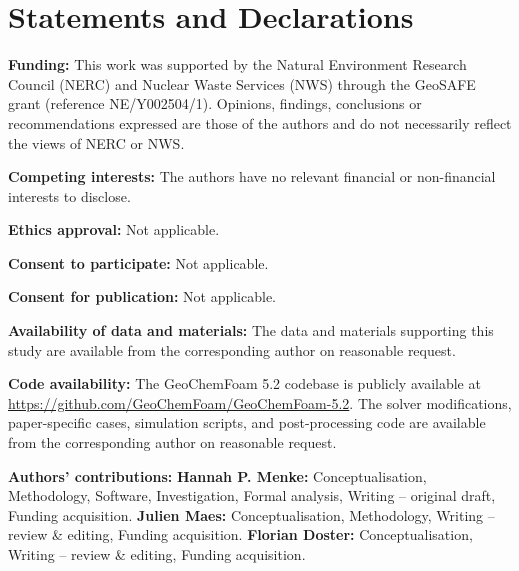 \documentclass[pdflatex,sn-basic]{sn-jnl}
\begin{document}
\backmatter



\section*{Statements and Declarations}

\textbf{Funding:} This work was supported by the Natural Environment Research
Council (NERC) and Nuclear Waste Services (NWS) through the GeoSAFE grant
(reference NE/Y002504/1). Opinions, findings, conclusions or recommendations
expressed are those of the authors and do not necessarily reflect the views
of NERC or NWS.

\textbf{Competing interests:} The authors have no relevant financial or
non-financial interests to disclose.

\textbf{Ethics approval:} Not applicable.

\textbf{Consent to participate:} Not applicable.

\textbf{Consent for publication:} Not applicable.

\textbf{Availability of data and materials:} The data and materials supporting
this study are available from the corresponding author on reasonable request.

\textbf{Code availability:} The GeoChemFoam 5.2 codebase is publicly available
at \url{https://github.com/GeoChemFoam/GeoChemFoam-5.2}. The solver modifications,
paper-specific cases, simulation scripts, and post-processing code are available
from the corresponding author on reasonable request.

\textbf{Authors' contributions:} \textbf{Hannah P. Menke:} Conceptualisation,
Methodology, Software, Investigation, Formal analysis, Writing -- original
draft, Funding acquisition. \textbf{Julien Maes:} Conceptualisation,
Methodology, Writing -- review \& editing, Funding acquisition.
\textbf{Florian Doster:} Conceptualisation, Writing -- review \& editing,
Funding acquisition.
\end{document}

